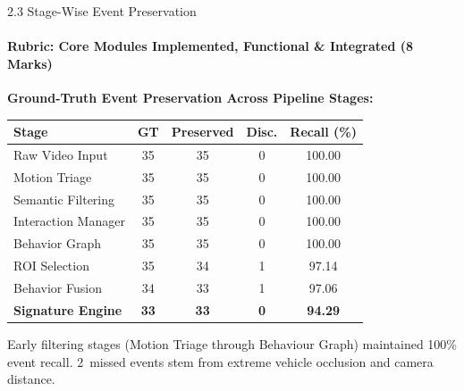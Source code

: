 \documentclass[aspectratio=169, 11pt]{beamer}
\begin{document}
\begin{frame}{2.3 Stage-Wise Event Preservation}
    \framesubtitle{Rubric: Core Modules Implemented, Functional \& Integrated (8 Marks)}
    \centering
    \textbf{Ground-Truth Event Preservation Across Pipeline Stages:}
    \vspace{0.2cm}
    \begin{table}
        \centering
        \small
        \renewcommand{\arraystretch}{1.0}
        \begin{tabular}{lcccc}
            \toprule
            \textbf{Stage} & \textbf{GT} & \textbf{Preserved} & \textbf{Disc.} & \textbf{Recall (\%)} \\
            \midrule
            Raw Video Input & 35 & 35 & 0 & 100.00 \\
            Motion Triage & 35 & 35 & 0 & 100.00 \\
            Semantic Filtering & 35 & 35 & 0 & 100.00 \\
            Interaction Manager & 35 & 35 & 0 & 100.00 \\
            Behavior Graph & 35 & 35 & 0 & 100.00 \\
            ROI Selection & 35 & 34 & 1 & 97.14 \\
            Behavior Fusion & 34 & 33 & 1 & 97.06 \\
            \textbf{Signature Engine} & \textbf{33} & \textbf{33} & \textbf{0} & \textbf{94.29} \\
            \bottomrule
        \end{tabular}
    \end{table}
    \vspace{0.5cm}
    {\small Early filtering stages (Motion Triage through Behaviour Graph) maintained 100\% event recall. 2~missed events stem from extreme vehicle occlusion and camera distance.}
\end{frame}
\end{document}
